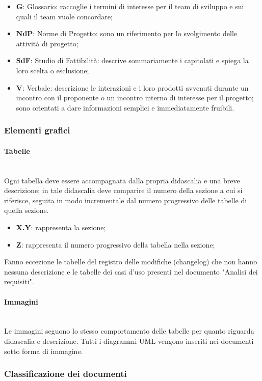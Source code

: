 		\begin{itemize}
			\item \textbf{G}: Glossario: raccoglie i termini di interesse per il team di sviluppo e sui quali il team vuole concordare;
			\item \textbf{NdP}: Norme di Progetto: sono un riferimento per lo svolgimento delle attività di progetto;
			\item \textbf{SdF}: Studio di Fattibilità: descrive sommariamente i capitolati e spiega la loro scelta o esclusione;
			\item \textbf{V}: Verbale: descrizione le interazioni e i loro prodotti avvenuti durante un incontro con il proponente o un incontro interno di interesse per il progetto; sono orientati a dare informazioni semplici e immediatamente fruibili. 
		\end{itemize}
		\subsubsection{Elementi grafici}
		\paragraph{Tabelle} \mbox{}\\
		Ogni tabella deve essere accompagnata dalla propria didascalia e una breve descrizione; in tale didascalia deve comparire il numero della sezione a cui si riferisce, seguita in modo incrementale dal numero progressivo delle tabelle di quella sezione.
		\begin{itemize}
			\item \textbf{{X.Y}}: rappresenta la sezione;
			\item \textbf{{Z}}: rappresenta il numero progressivo della tabella nella sezione;
		\end{itemize}
		Fanno eccezione le tabelle del registro delle modifiche (changelog) che non hanno nessuna descrizione e le tabelle dei casi d’uso presenti nel documento
		"Analisi dei requisiti".
		\paragraph{Immagini} \mbox{}\\
		Le immagini seguono lo stesso comportamento delle tabelle per quanto riguarda didascalia e descrizione. Tutti i diagrammi UML vengono inseriti nei documenti sotto forma di immagine.
		\subsubsection{Classificazione dei documenti}
